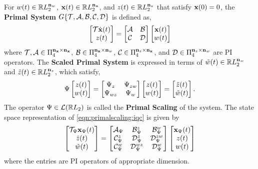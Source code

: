 \begin{definition}\label{def:primalscaledsys:iqc}
    For $w(t)\in\mathbb{R} L_2^{\mathbf{n}_w}$, $\mathbf{x}(t)\in\mathbb{R} L_2^{\mathbf{n}_{\mathbf{x}}}$, and 
    $z(t)\in\mathbb{R} L_2^{\mathbf{n}_z}$ that satisfy $\mathbf{x}(0) = 0$, the \textbf{Primal System} 
    $G\{\mathcal{T}, \mathcal{A}, \mathcal{B}, \mathcal{C}, \mathcal{D}\}$ is defined as,
    \begin{equation}\label{eqn:primalsys:iqc}
        \begin{bmatrix}\mathcal{T}\dot{\mathbf{x}}(t)\\ z(t)\end{bmatrix} = \begin{bmatrix}\mathcal{A} & \mathcal{B} \\ 
        \mathcal{C} & \mathcal{D}\end{bmatrix}\begin{bmatrix}\mathbf{x}(t) \\ w(t)\end{bmatrix}
    \end{equation}
    where $\mathcal{T}, \mathcal{A}\in \Pi_4^{\mathbf{n}_{\mathbf{x}} \times \mathbf{n}_{\mathbf{x}}}$, 
    $\mathcal{B}\in\Pi_4^{\mathbf{n}_{\mathbf{x}} \times \mathbf{n}_{w}}$, 
    $\mathcal{C}\in\Pi_4^{\mathbf{n}_z \times \mathbf{n}_{\mathbf{x}}}$, and 
    $\mathcal{D}\in\Pi_4^{\mathbf{n}_z \times \mathbf{n}_{w}}$ are PI operators.
    The \textbf{Scaled Primal System} is expressed in terms of $\tilde{w}(t)\in
    \mathbb{R} L_2^{\mathbf{n}_w}$ and $\tilde{z}(t)\in\mathbb{R} L_2^{\mathbf{n}_z}$, which satisfy,
    \begin{equation}\label{eqn:primalscaling:iqc}
        \Psi \begin{bmatrix}z(t) \\ w(t)\end{bmatrix} = {\begin{bmatrix}\Psi_{z} & \Psi_{zw} \\ 
        \Psi_{wz} & \Psi_{w}\end{bmatrix}}\begin{bmatrix}z(t) \\ w(t)\end{bmatrix} = \begin{bmatrix}\tilde{z}(t) \\ \tilde{w}(t)\end{bmatrix}.
    \end{equation}
    The operator $\Psi\in\mathcal{L}(\mathbb{R} L_2)$ is called the \textbf{Primal Scaling} of the system.
    The state space representation of \eqref{eqn:primalscaling:iqc} is given by
    \begin{equation}\label{eqn:ssprimalscaling:iqc}
        \begin{bmatrix}\mathcal{T}_\Psi \mathbf{x}_\Psi(t)\\ \tilde{z}(t) \\ \tilde{w}(t)\end{bmatrix}
        =
        \begin{bmatrix}\mathcal{A}_\Psi & \mathcal{B}_\Psi^z & \mathcal{B}_\Psi^w \\
            \mathcal{C}_\Psi^z & \mathcal{D}_\Psi^z & \mathcal{D}_\Psi^{zw}\\
            \mathcal{C}_\Psi^w & \mathcal{D}_\Psi^{wz} & \mathcal{D}_\Psi^w\end{bmatrix}\begin{bmatrix}\mathbf{x}_\Psi(t) \\ {z}(t) \\ {w}(t)\end{bmatrix}
    \end{equation}
    where the entries are PI operators of appropriate dimension.
\end{definition}



